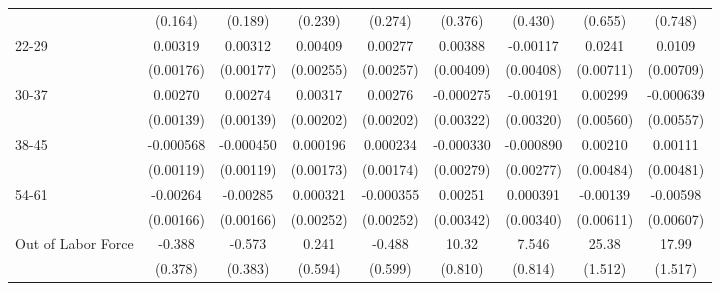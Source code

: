 {\begin{tabular}{l*{4}{c}|*{4}{c}}
                    &     (0.164)         &     (0.189)         &     (0.239)         &     (0.274)         &     (0.376)         &     (0.430)         &     (0.655)         &     (0.748)         \\
[1em]
22-29               &     0.00319\sym{*}  &     0.00312\sym{*}  &     0.00409         &     0.00277         &     0.00388         &    -0.00117         &      0.0241\sym{***}&      0.0109         \\
                    &   (0.00176)         &   (0.00177)         &   (0.00255)         &   (0.00257)         &   (0.00409)         &   (0.00408)         &   (0.00711)         &   (0.00709)         \\
[1em]
30-37               &     0.00270\sym{*}  &     0.00274\sym{**} &     0.00317         &     0.00276         &   -0.000275         &    -0.00191         &     0.00299         &   -0.000639         \\
                    &   (0.00139)         &   (0.00139)         &   (0.00202)         &   (0.00202)         &   (0.00322)         &   (0.00320)         &   (0.00560)         &   (0.00557)         \\
[1em]
38-45               &   -0.000568         &   -0.000450         &    0.000196         &    0.000234         &   -0.000330         &   -0.000890         &     0.00210         &     0.00111         \\
                    &   (0.00119)         &   (0.00119)         &   (0.00173)         &   (0.00174)         &   (0.00279)         &   (0.00277)         &   (0.00484)         &   (0.00481)         \\
[1em]
54-61               &    -0.00264         &    -0.00285\sym{*}  &    0.000321         &   -0.000355         &     0.00251         &    0.000391         &    -0.00139         &    -0.00598         \\
                    &   (0.00166)         &   (0.00166)         &   (0.00252)         &   (0.00252)         &   (0.00342)         &   (0.00340)         &   (0.00611)         &   (0.00607)         \\
[1em]
Out of Labor Force  &      -0.388         &      -0.573         &       0.241         &      -0.488         &       10.32\sym{***}&       7.546\sym{***}&       25.38\sym{***}&       17.99\sym{***}\\
                    &     (0.378)         &     (0.383)         &     (0.594)         &     (0.599)         &     (0.810)         &     (0.814)         &     (1.512)         &     (1.517)         \\

\end{tabular}}
